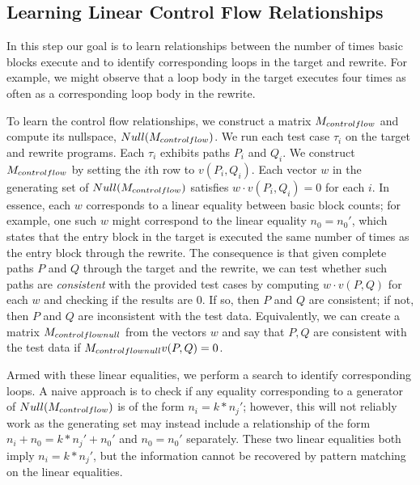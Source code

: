 
\subsection{Learning Linear Control Flow Relationships} \label{algstep1}

In this step our goal is to learn relationships between the number of
times basic blocks execute and to identify corresponding loops in the
target and rewrite. For example, we might observe that a loop body in
the target executes four times as often as a corresponding loop body
in the rewrite.

To learn the control flow relationships, we construct a
matrix $M_{controlflow}$ and compute its nullspace,
$Null(M_{controlflow})$. We run each test case $\tau_i$ on
the target and rewrite programs. Each $\tau_i$ exhibits paths $P_i$
and $Q_i$. We construct $M_{controlflow}$ by setting the $i$th
row to $v(P_i, Q_i)$. Each vector $w$ in the generating set of
$Null(M_{controlflow})$ satisfies $w \cdot v(P_i, Q_i) = 0$
for each $i$. In essence, each $w$ corresponds to a linear equality
between basic block counts; for example, one such $w$ might correspond
to the linear equality $n_0 = n_0'$, which states that the entry block
in the target is executed the same number of times as the entry block
through the rewrite. The consequence is that given complete paths
$P$ and $Q$ through the target and the rewrite, we can test whether
such paths are \emph{consistent} with the provided test cases by computing
$w\cdot v(P,Q)$ for each $w$ and checking if the results are 0. If
so, then $P$ and $Q$ are consistent; if not, then $P$ and $Q$ are
inconsistent with the test data. Equivalently, we can create a matrix
$M_{controlflownull}$ from the vectors $w$ and say that $P,Q$ are
consistent with the test data if $M_{controlflownull} v(P,Q) = 0$.

 Armed with these linear equalities, we perform a search to
identify corresponding loops. A naive approach is to check if any
equality corresponding to a generator of $Null(M_{controlflow})$
is of the form $n_i = k*n_j'$; however, this will not reliably work as
the generating set may instead include a relationship of the form $n_i
+ n_0 = k*n_j' + n_0'$ and $n_0 = n_0'$ separately. These two linear
equalities both imply $n_i = k*n_j'$, but the information cannot be
recovered by pattern matching on the linear equalities. 

